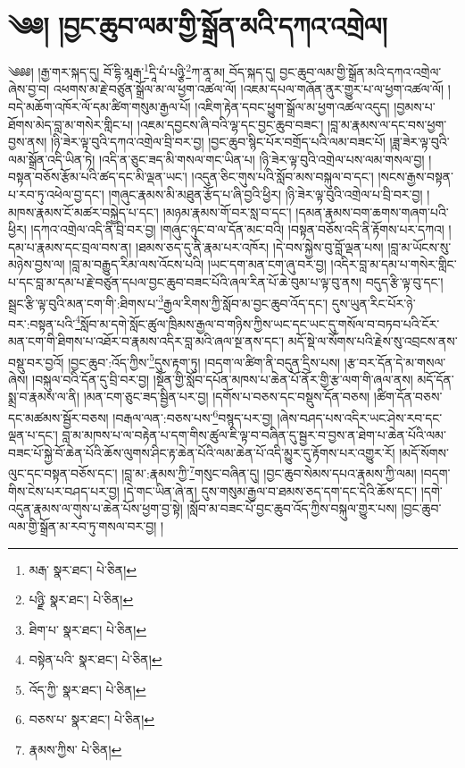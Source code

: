 \setcounter{footnote}{0} 
\chapter{༄༅། །བྱང་ཆུབ་ལམ་གྱི་སྒྲོན་མའི་དཀའ་འགྲེལ།}༄༅༅། །རྒྱ་གར་སྐད་དུ། བོ་དྷི་མཱརྒ་\footnote{མརྒ་  སྣར་ཐང་།  པེ་ཅིན། }དཱི་པཾ་པཉྩི་\footnote{པཉྫི་  སྣར་ཐང་།  པེ་ཅིན། }ཀ་ནཱ་མ། བོད་སྐད་དུ། བྱང་ཆུབ་ལམ་གྱི་སྒྲོན་མའི་དཀའ་འགྲེལ་ཞེས་བྱ་བ། འཕགས་མ་རྗེ་བཙུན་སྒྲོལ་མ་ལ་ཕྱག་འཚལ་ལོ། །འཇམ་དཔལ་གཞོན་ནུར་གྱུར་པ་ལ་ཕྱག་འཚལ་ལོ། །བདེ་མཆོག་འཁོར་ལོ་དམ་ཚིག་གསུམ་རྒྱལ་པོ། །འཇིག་རྟེན་དབང་ཕྱུག་སྒྲོལ་མ་ཕྱག་འཚལ་འདུད། །བྱམས་པ་ཐོགས་མེད་བླ་མ་གསེར་གླིང་པ། །འཇམ་དབྱངས་ཞི་བའི་ལྷ་དང་བྱང་ཆུབ་བཟང་། །བླ་མ་རྣམས་ལ་དང་བས་ཕྱག་བྱས་ནས། །ཉི་ཟེར་ལྟ་བུའི་དཀའ་འགྲེལ་བྲི་བར་བྱ། །བྱང་ཆུབ་སྙིང་པོར་བགྲོད་པའི་ལམ་བཟང་པོ། །ཟླ་ཟེར་ལྟ་བུའི་ལམ་སྒྲོན་འདི་ཡིན་ཏེ། །འདི་ན་ཅུང་ཟད་མི་གསལ་གང་ཡིན་པ། །ཉི་ཟེར་ལྟ་བུའི་འགྲེལ་པས་ལམ་གསལ་བྱ། །བསྟན་བཅོས་རྩོམ་པའི་ཚད་དང་མི་ལྡན་ཡང་། །འདུན་ཅིང་གུས་པའི་སློབ་མས་བསྐུལ་བ་དང་། །སངས་རྒྱས་བསྟན་པ་རབ་ཏུ་འཕེལ་བྱ་དང་། །གཞུང་རྣམས་མི་མཐུན་རྩོད་པ་ཞི་བྱའི་ཕྱིར། །ཉི་ཟེར་ལྟ་བུའི་འགྲེལ་པ་བྲི་བར་བྱ། །མཁས་རྣམས་ངོ་མཚར་བསྐྱེད་པ་དང་། །མཉམ་རྣམས་གོ་བར་སླ་བ་དང་། །དམན་རྣམས་བག་ཆགས་གཞག་པའི་ཕྱིར། །དཀའ་འགྲེལ་འདི་ནི་བྲི་བར་བྱ། །གཞུང་ཉུང་བ་ལ་དོན་མང་བའི། །བསྟན་བཅོས་འདི་ནི་རྟོགས་པར་དཀའ། །དམ་པ་རྣམས་དང་བྲལ་བས་ན། །ཐམས་ཅད་དུ་ནི་རྣམ་པར་འཁོར། །དེ་བས་སྐྱེས་བུ་བློ་ལྡན་པས། །བླ་མ་ཡོངས་སུ་མཉེས་བྱས་ལ། །བླ་མ་བརྒྱུད་རིམ་ལས་འོངས་པའི། །ཡང་དག་མན་ངག་ཞུ་བར་བྱ། །འདིར་བླ་མ་དམ་པ་གསེར་གླིང་པ་དང་བླ་མ་དམ་པ་རྗེ་བཙུན་དཔལ་བྱང་ཆུབ་བཟང་པོའི་ཞལ་རིན་པོ་ཆེ་བུམ་པ་ལྟ་བུ་ནས། བདུད་རྩི་ལྟ་བུ་དང་། སྦྲང་རྩི་ལྟ་བུའི་མན་ངག་གི་:ཐིགས་པ་\footnote{ཐིག་པ་  སྣར་ཐང་།  པེ་ཅིན། }རྒྱལ་རིགས་ཀྱི་སློབ་མ་བྱང་ཆུབ་འོད་དང་། དུས་ཡུན་རིང་པོར་ཉེ་བར་:བསྟན་པའི་\footnote{བསྟེན་པའི་  སྣར་ཐང་།  པེ་ཅིན། }སློབ་མ་དགེ་སློང་ཚུལ་ཁྲིམས་རྒྱལ་བ་གཉིས་ཀྱིས་ཡང་དང་ཡང་དུ་གསོལ་བ་བཏབ་པའི་ངོར་མན་ངག་གི་ཐིགས་པ་འཐོར་བ་རྣམས་འདིར་བླ་མའི་ཞལ་སྔ་ནས་དང་། མདོ་སྡེ་ལ་སོགས་པའི་རྗེས་སུ་འབྲངས་ནས་བསྡུ་བར་བྱའོ། །བྱང་ཆུབ་:འོད་ཀྱིས་\footnote{འོད་ཀྱི་  སྣར་ཐང་།  པེ་ཅིན། }དུས་རྟག་ཏུ། །བདག་ལ་ཚིག་ནི་བདུན་དྲིས་པས། །རྩ་བར་དོན་དེ་མ་གསལ་ཞེས། །བསྐུལ་བའི་དོན་དུ་བྲི་བར་བྱ། །སྔོན་གྱི་སློབ་དཔོན་མཁས་པ་ཆེན་པོ་ནོར་གྱི་རྩ་ལག་གི་ཞལ་ནས། མདོ་དོན་སྨྲ་བ་རྣམས་ལ་ནི། །མན་ངག་ཅུང་ཟད་སྦྱིན་པར་བྱ། །དགོས་པ་བཅས་དང་བསྡུས་དོན་བཅས། །ཚིག་དོན་བཅས་དང་མཚམས་སྦྱོར་བཅས། །བརྒལ་ལན་:བཅས་པས་\footnote{བཅས་པ་  སྣར་ཐང་།  པེ་ཅིན། }བསྙད་པར་བྱ། །ཞེས་བཤད་པས་འདིར་ཡང་ཤེས་རབ་དང་ལྡན་པ་དང་། བླ་མ་མཁས་པ་ལ་བརྟེན་པ་དག་གིས་ཚུལ་ཇི་ལྟ་བ་བཞིན་དུ་སྦྱར་བ་བྱས་ན་ཐེག་པ་ཆེན་པོའི་ལམ་བཟང་པོ་སྐྱེ་བོ་ཆེན་པོའི་ཆོས་ལུགས་ཤིང་རྟ་ཆེན་པོའི་ལམ་ཆེན་པོ་འདི་མྱུར་དུ་རྟོགས་པར་འགྱུར་རོ། །མདོ་སོགས་ལུང་དང་བསྟན་བཅོས་དང་། །བླ་མ་:རྣམས་ཀྱི་\footnote{རྣམས་ཀྱིས་  པེ་ཅིན། }གསུང་བཞིན་དུ། །བྱང་ཆུབ་སེམས་དཔའ་རྣམས་ཀྱི་ལམ། །བདག་གིས་ངེས་པར་བཤད་པར་བྱ། །དེ་གང་ཡིན་ཞེ་ན། དུས་གསུམ་རྒྱལ་བ་ཐམས་ཅད་དག་དང་དེའི་ཆོས་དང་། །དགེ་འདུན་རྣམས་ལ་གུས་པ་ཆེན་པོས་ཕྱག་བྱ་སྟེ། །སློབ་མ་བཟང་པོ་བྱང་ཆུབ་འོད་ཀྱིས་བསྐུལ་གྱུར་པས། །བྱང་ཆུབ་ལམ་གྱི་སྒྲོན་མ་རབ་ཏུ་གསལ་བར་བྱ། །
